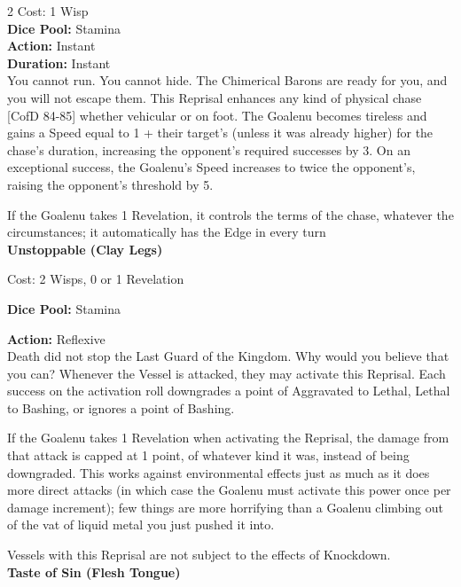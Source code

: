 \begin{multicols}{2}
\noindent Cost: 1 Wisp\\

\noindent\textbf{Dice Pool:} Stamina\\

\noindent\textbf{Action:} Instant\\

\noindent\textbf{Duration:} Instant\\

\noindent You cannot run. You cannot hide. The Chimerical Barons are ready for you, and you will not escape them. This Reprisal enhances any kind of physical chase [CofD 84-85] whether vehicular or on foot. The Goalenu becomes tireless and gains a Speed equal to 1 + their target’s (unless it was already higher) for the chase’s duration, increasing the opponent’s required successes by 3. On an exceptional success, the Goalenu’s Speed increases to twice the opponent’s, raising the opponent’s threshold by 5.

If the Goalenu takes 1 Revelation, it controls the terms of the chase, whatever the circumstances; it automatically has the Edge in every turn\\

\noindent\textbf{Unstoppable (Clay Legs)}

\noindent Cost: 2 Wisps, 0 or 1 Revelation

\noindent\textbf{Dice Pool:} Stamina

\noindent\textbf{Action:} Reflexive\\

\noindent Death did not stop the Last Guard of the Kingdom. Why would you believe that you can? Whenever the Vessel is attacked, they may activate this Reprisal. Each success on the activation roll downgrades a point of Aggravated to Lethal, Lethal to Bashing, or ignores a point of Bashing.

If the Goalenu takes 1 Revelation when activating the Reprisal, the damage from that attack is capped at 1 point, of whatever kind it was, instead of being downgraded. This works against environmental effects just as much as it does more direct attacks (in which case the Goalenu must activate this power once per damage increment); few things are more horrifying than a Goalenu climbing out of the vat of liquid metal you just pushed it into.

Vessels with this Reprisal are not subject to the effects of Knockdown.\\

\noindent\textbf{Taste of Sin (Flesh Tongue)}


\end{multicols}
